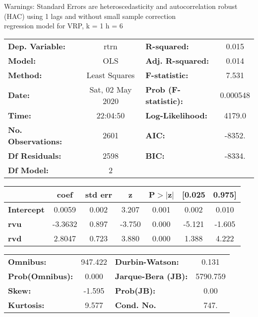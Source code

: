 Warnings: \newline
 [1] Standard Errors are heteroscedasticity and autocorrelation robust (HAC) using 1 lags and without small sample correction\\ 

regression model for VRP, k = 1 h = 6\begin{center}
\begin{tabular}{lclc}
\toprule
\textbf{Dep. Variable:}    &       rtrn       & \textbf{  R-squared:         } &     0.015   \\
\textbf{Model:}            &       OLS        & \textbf{  Adj. R-squared:    } &     0.014   \\
\textbf{Method:}           &  Least Squares   & \textbf{  F-statistic:       } &     7.531   \\
\textbf{Date:}             & Sat, 02 May 2020 & \textbf{  Prob (F-statistic):} &  0.000548   \\
\textbf{Time:}             &     22:04:50     & \textbf{  Log-Likelihood:    } &    4179.0   \\
\textbf{No. Observations:} &        2601      & \textbf{  AIC:               } &    -8352.   \\
\textbf{Df Residuals:}     &        2598      & \textbf{  BIC:               } &    -8334.   \\
\textbf{Df Model:}         &           2      & \textbf{                     } &             \\
\bottomrule
\end{tabular}
\begin{tabular}{lcccccc}
                   & \textbf{coef} & \textbf{std err} & \textbf{z} & \textbf{P$> |$z$|$} & \textbf{[0.025} & \textbf{0.975]}  \\
\midrule
\textbf{Intercept} &       0.0059  &        0.002     &     3.207  &         0.001        &        0.002    &        0.010     \\
\textbf{rvu}       &      -3.3632  &        0.897     &    -3.750  &         0.000        &       -5.121    &       -1.605     \\
\textbf{rvd}       &       2.8047  &        0.723     &     3.880  &         0.000        &        1.388    &        4.222     \\
\bottomrule
\end{tabular}
\begin{tabular}{lclc}
\textbf{Omnibus:}       & 947.422 & \textbf{  Durbin-Watson:     } &    0.131  \\
\textbf{Prob(Omnibus):} &   0.000 & \textbf{  Jarque-Bera (JB):  } & 5790.759  \\
\textbf{Skew:}          &  -1.595 & \textbf{  Prob(JB):          } &     0.00  \\
\textbf{Kurtosis:}      &   9.577 & \textbf{  Cond. No.          } &     747.  \\
\bottomrule
\end{tabular}
\end{center}

